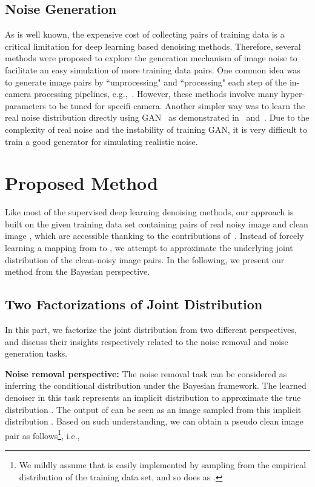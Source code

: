 \documentclass[runningheads]{llncs}
\begin{document}
\subsection{Noise Generation}
As is well known, the expensive cost of collecting pairs of training data is a critical limitation
for deep learning based denoising methods. Therefore, several methods were proposed to explore the generation
mechanism of image noise to facilitate an easy simulation of more training data pairs. 
One common idea was to generate image pairs
by ``unprocessing" and ``processing" each step of the in-camera processing pipelines,
e.g.,~\cite{guo2019toward,brooks2019unprocessing,Jaroensri2019}. However, these methods involve many
hyper-parameters to be tuned for specifi camera. Another simpler way was to learn the real
noise distribution directly using GAN~\cite{goodfellow2014generative} as demonstrated in~\cite{chen2018image}
and~\cite{kim2019grdn}. Due to the complexity of real noise and the instability of training GAN, it is very
difficult to train a good generator for simulating realistic noise.

\section{Proposed Method}
Like most of the supervised deep learning denoising methods, our approach is built on the given training data set
containing pairs of real noisy image  and clean image , which are accessible thanking to the contributions
of~\cite{Anaya2014,SIDD_2018_CVPR,xu2018real}. Instead of forcely learning a mapping
from  to , we attempt to approximate the underlying joint distribution  of
the clean-noisy image pairs. In the following, we present our method from the Bayesian perspective.

\subsection{Two Factorizations of Joint Distribution}\label{subsec:joint-sampling}
In this part, we factorize the joint distribution  from two different perspectives, and
discuss their insights respectively related to the noise removal and noise generation tasks.

\vspace{2mm}
\noindent\textbf{Noise removal perspective:} The noise removal task can be considered as inferring the conditional
distribution  under the Bayesian framework. The learned denoiser  in this task represents
an implicit distribution  to approximate the true distribution . 
The output of  can be seen as an image sampled from this implicit distribution .
Based on such understanding, we can obtain a pseudo clean image pair  as
follows\footnote{We mildly assume that 
is easily implemented by sampling  from the empirical distribution  of the training
data set, and so does as .}, i.e.,
\end{document}

